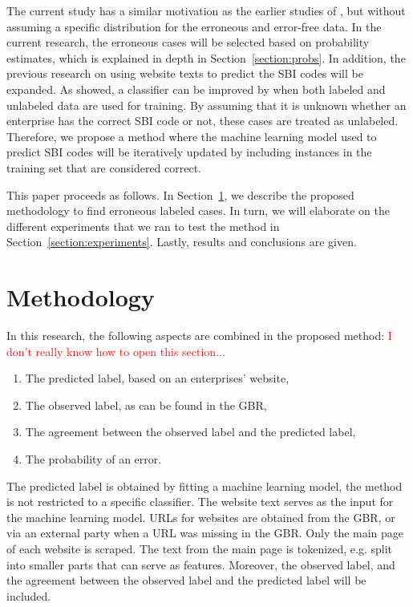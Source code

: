 \documentclass[12pt, a4paper, titlepage]{article}
\begin{document}
The current study has a similar motivation as the earlier studies of \citet{DiZio, Eskin}, but without assuming a specific distribution for the erroneous and error-free data. In the current research, the erroneous cases will be selected based on probability estimates, which is explained in depth in Section~\ref{section:probs}. In addition, the previous research on using website texts to predict the SBI codes will be expanded. As \citet{Nigam} showed, a classifier can be improved by when both labeled and unlabeled data are used for training. By assuming that it is unknown whether an enterprise has the correct SBI code or not, these cases are treated as unlabeled. Therefore, we propose a method where the machine learning model used to predict SBI codes will be iteratively updated by including instances in the training set that are considered correct. 

\bigskip

This paper proceeds as follows. In Section~\ref{section:method}, we describe the proposed methodology to find erroneous labeled cases. In turn, we will elaborate on the different experiments that we ran to test the method in Section~\ref{section:experiments}. Lastly, results and conclusions are given.




							\section{Methodology}
							\label{section:method}

In this research, the following aspects are combined in the proposed method:
\textcolor{red}{I don't really know how to open this section...}


\begin{enumerate}
\item The predicted label, based on an enterprises' website,
\item The observed label, as can be found in the GBR,
\item The agreement between the observed label and the predicted label,
\item The probability of an error.
\end{enumerate}

The predicted label is obtained by fitting a machine learning model, the method is not restricted to a specific classifier.  The website text serves as the input for the machine learning model. URLs for websites are obtained from the GBR, or via an external party when a URL was missing in the GBR. Only the main page of each website is scraped. The text from the main page is tokenized, e.g. split into smaller parts that can serve as features. Moreover, the observed label, and the agreement between the observed label and the predicted label will be included. 
\end{document}
